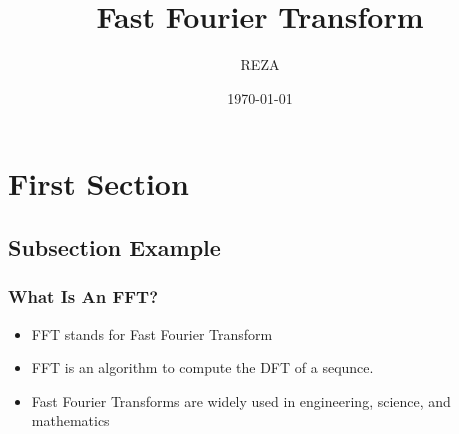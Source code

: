 \documentclass{beamer}
\title[FFT]{Fast Fourier Transform} %
\author{REZA} %
\institute[UNH] %
{
University of New Hamshire \\ %
\medskip
}
\date{\today} %
\begin{document}

\begin{frame}
\titlepage %
\end{frame}



\section{First Section} %

\subsection{Subsection Example} %

\begin{frame}
\frametitle{What Is An FFT?}
\begin{itemize}
\item FFT stands for Fast Fourier Transform
\item FFT is an algorithm to compute the DFT of a sequnce. 
\item Fast Fourier Transforms are widely used in engineering, science, and mathematics
\end{itemize}
\end{frame}
\end{document}
